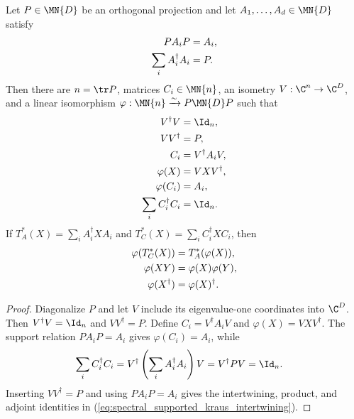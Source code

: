 \begin{theorem}%
    \label{thm:supported_kraus_corner_compression}
    \leanok
    Let $P\in\MN{D}$ be an orthogonal projection and let
    $A_1,\ldots,A_d\in\MN{D}$ satisfy
    \begin{align}
        PA_iP
         & =A_i,
        \notag        \\
        \sum_i A_i^\dagger A_i
         & =P.
        \label{eq:spectral_supported_kraus_normalization}
    \end{align}
    Then there are $n=\tr P$, matrices $C_i\in\MN{n}$, an isometry
    $V:\C^n\to\C^D$, and a linear isomorphism
    $\varphi:\MN{n}\xrightarrow{\sim}P\MN{D}P$ such that
    \begin{align}
        V^\dagger V
         & =\Id_n,
        \notag        \\
        VV^\dagger
         & =P,
        \notag        \\
        C_i
         & =V^\dagger A_iV,
        \notag        \\
        \varphi(X)
         & =VXV^\dagger,
        \notag        \\
        \varphi(C_i)
         & =A_i,
        \notag        \\
        \sum_i C_i^\dagger C_i
         & =\Id_n.
        \label{eq:spectral_supported_kraus_compression}
    \end{align}
    If
    $T_A^*(X)=\sum_iA_i^\dagger XA_i$ and
    $T_C^*(X)=\sum_iC_i^\dagger XC_i$, then
    \begin{align}
        \varphi(T_C^*(X))
         & =T_A^*(\varphi(X)),
        \notag                              \\
        \varphi(XY)
         & =\varphi(X)\varphi(Y),
        \notag                              \\
        \varphi(X^\dagger)
         & =\varphi(X)^\dagger.
        \label{eq:spectral_supported_kraus_intertwining}
    \end{align}
\end{theorem}

\begin{proof}\leanok
    Diagonalize $P$ and let $V$ include its eigenvalue-one coordinates into
    $\C^D$. Then $V^\dagger V=\Id_n$ and $VV^\dagger=P$. Define
    $C_i=V^\dagger A_iV$ and $\varphi(X)=VXV^\dagger$. The support relation
    $PA_iP=A_i$ gives $\varphi(C_i)=A_i$, while
    \begin{align}
        \sum_i C_i^\dagger C_i
         & =V^\dagger\left(\sum_iA_i^\dagger A_i\right)V
          =V^\dagger PV
          =\Id_n.
        \notag
    \end{align}
    Inserting $VV^\dagger=P$ and using $PA_iP=A_i$ gives the intertwining,
    product, and adjoint identities in
    (\ref{eq:spectral_supported_kraus_intertwining}).
\end{proof}

